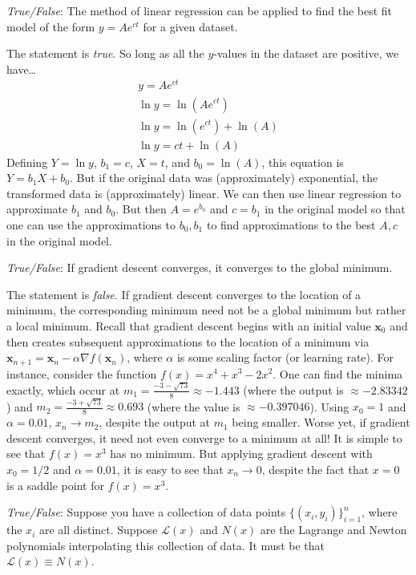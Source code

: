 \documentclass[11pt,letterpaper]{article}
\begin{document}
\quizsol \textit{True/False}: The method of linear regression can be applied to find the best fit model of the form $y= Ae^{ct}$ for a given dataset. \pspace

\sol The statement is \textit{true}. So long as all the $y$-values in the dataset are positive, we have\dots
	\[
	\begin{gathered}
	y= Ae^{ct} \\[0.3cm]
	\ln y = \ln \left( A e^{ct} \right) \\[0.3cm]
	\ln y = \ln \left( e^{ct} \right) + \ln(A) \\[0.3cm]
	\ln y = ct + \ln(A)
	\end{gathered}
	\]
Defining $Y= \ln y$, $b_1= c$, $X= t$, and $b_0= \ln(A)$, this equation is $Y= b_1 X + b_0$. But if the original data was (approximately) exponential, the transformed data is (approximately) linear. We can then use linear regression to approximate $b_1$ and $b_0$. But then $A= e^{b_0}$ and $c= b_1$ in the original model so that one can use the approximations to $b_0, b_1$ to find approximations to the best $A, c$ in the original model. \pvspace{1.3cm}



\quizsol \textit{True/False}: If gradient descent converges, it converges to the global minimum. \pspace

\sol The statement is \textit{false}. If gradient descent converges to the location of a minimum, the corresponding minimum need not be a global minimum but rather a local minimum. Recall that gradient descent begins with an initial value $\mathbf{x}_0$ and then creates subsequent approximations to the location of a minimum via $\mathbf{x}_{n+1}= \mathbf{x}_n - \alpha \nabla f(\mathbf{x}_n)$, where $\alpha$ is some scaling factor (or learning rate). For instance, consider the function $f(x)= x^4 + x^3 - 2x^2$. One can find the minima exactly, which occur at $m_1= \frac{-3 - \sqrt{73}}{8} \approx -1.443$ (where the output is $\approx -2.83342$) and $m_2= \frac{-3 + \sqrt{73}}{8} \approx 0.693$ (where the value is $\approx -0.397046$). Using $x_0= 1$ and $\alpha= 0.01$, $x_n \to m_2$, despite the output at $m_1$ being smaller. Worse yet, if gradient descent converges, it need not even converge to a minimum at all! It is simple to see that $f(x)= x^3$ has no minimum. But applying gradient descent with $x_0= 1/2$ and $\alpha= 0.01$, it is easy to see that $x_n \to 0$, despite the fact that $x= 0$ is a saddle point for $f(x)= x^3$. 


\quizsol \textit{True/False}: Suppose you have a collection of data points $\{ (x_i, y_i) \}_{i=1}^n$, where the $x_i$ are all distinct. Suppose $\mathcal{L}(x)$ and $N(x)$ are the Lagrange and Newton polynomials interpolating this collection of data. It must be that $\mathcal{L}(x) \equiv N(x)$.
\end{document}

